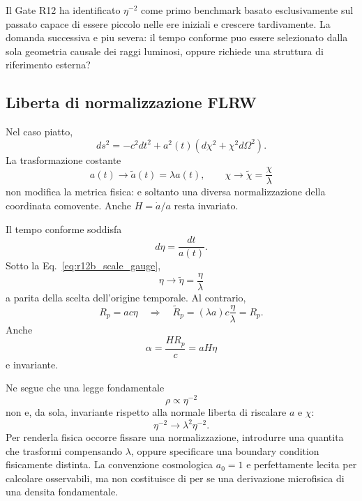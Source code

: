 \documentclass[11pt,a4paper]{article}
\begin{document}
Il Gate R12 ha identificato $\eta^{-2}$ come primo benchmark basato esclusivamente sul passato capace di essere piccolo nelle ere iniziali e crescere tardivamente. La domanda successiva e piu severa: il tempo conforme puo essere selezionato dalla sola geometria causale dei raggi luminosi, oppure richiede una struttura di riferimento esterna?

\subsection{Liberta di normalizzazione FLRW}

Nel caso piatto,
\begin{equation}
 ds^2=-c^2dt^2+a^2(t)\left(d\chi^2+\chi^2d\Omega^2\right).
\end{equation}
La trasformazione costante
\begin{equation}
 \boxed{a(t)\longrightarrow\tilde a(t)=\lambda a(t),
 \qquad
 \chi\longrightarrow\tilde\chi=\frac{\chi}{\lambda}}
 \label{eq:r12b_scale_gauge}
\end{equation}
non modifica la metrica fisica: e soltanto una diversa normalizzazione della coordinata comovente. Anche $H=\dot a/a$ resta invariato.

Il tempo conforme soddisfa
\begin{equation}
 d\eta=\frac{dt}{a(t)}.
\end{equation}
Sotto la Eq.~\eqref{eq:r12b_scale_gauge},
\begin{equation}
 \boxed{\eta\longrightarrow\tilde\eta=\frac{\eta}{\lambda}}
 \label{eq:r12b_eta_scaling}
\end{equation}
a parita della scelta dell'origine temporale. Al contrario,
\begin{equation}
 R_p=ac\eta
 \quad\Longrightarrow\quad
 \tilde R_p=(\lambda a)c\frac{\eta}{\lambda}=R_p.
\end{equation}
Anche
\begin{equation}
 \alpha=\frac{HR_p}{c}=aH\eta
\end{equation}
e invariante.

Ne segue che una legge fondamentale
\begin{equation}
 \rho\propto\eta^{-2}
\end{equation}
non e, da sola, invariante rispetto alla normale liberta di riscalare $a$ e $\chi$:
\begin{equation}
 \eta^{-2}\longrightarrow\lambda^2\eta^{-2}.
\end{equation}
Per renderla fisica occorre fissare una normalizzazione, introdurre una quantita che trasformi compensando $\lambda$, oppure specificare una boundary condition fisicamente distinta. La convenzione cosmologica $a_0=1$ e perfettamente lecita per calcolare osservabili, ma non costituisce di per se una derivazione microfisica di una densita fondamentale.
\end{document}
